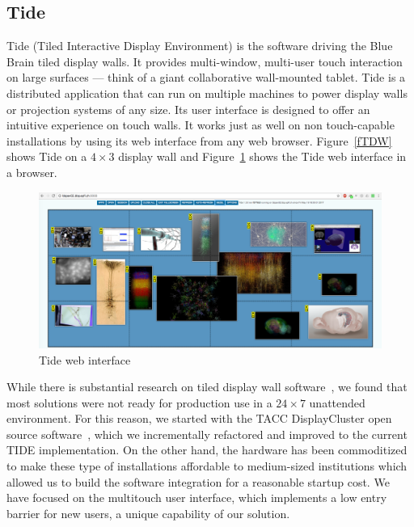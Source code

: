 \documentclass[10pt]{llncs}
\newcommand{\fig}[1]{Figure~\ref{#1}}
\begin{document}
\subsection{Tide}

Tide (Tiled Interactive Display Environment) is the software driving the Blue
Brain tiled display walls. It provides multi-window, multi-user touch
interaction on large surfaces --- think of a giant collaborative wall-mounted
tablet. Tide is a distributed application that can run on multiple machines to
power display walls or projection systems of any size. Its user interface is
designed to offer an intuitive experience on touch walls. It works just as
well on non touch-capable installations by using its web interface from any
web browser. \fig{fTDW} shows Tide on a $4\times 3$ display wall and
\fig{fTideWeb} shows the Tide web interface in a browser.

\begin{figure}[h!t]
  \includegraphics[width=\columnwidth]{images/tideweb}
  \caption{\label{fTideWeb}Tide web interface}
\end{figure}

While there is substantial research on tiled display wall software~\cite{Sage,
Sage2, Omegalib, DK:11, JLMV:06, DisplayCluster}, we found that most solutions
were not ready for production use in a $24\times 7$ unattended environment. For
this reason, we started with the TACC DisplayCluster open source
software~\cite{DisplayCluster}, which we incrementally refactored and improved
to the current TIDE implementation. On the other hand, the hardware has been
commoditized to make these type of installations affordable to medium-sized
institutions which allowed us to build the software integration for a reasonable
startup cost. %
We have focused on the multitouch user interface, which implements
a low entry barrier for new users, a unique capability of our solution.
\end{document}
